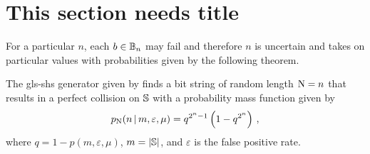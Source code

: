 \documentclass[ ../main.tex]{subfiles}
\begin{document}
\section{This section needs title}
For a particular $n$, each $b \in \mathbb{B}_n$ may fail and therefore $n$ is uncertain and takes on particular values with probabilities given by the following theorem.
\begin{theorem}
\label{thm:N_pmf}
The \gls{gls-shs} generator given by  finds a bit string of random length $\mathrm{N} = n$ that results in a perfect collision on $\mathbb{S}$ with a probability mass function given by
\begin{equation}
\label{eq:N_pmf}
    p_{\mathrm{N}}(n {\,|\,} m, \varepsilon, \mu) = q^{2^n-1}\left(1 - q^{2^n}\right)\,,
\end{equation}
where $q = 1 - p(m,\varepsilon,\mu)$, $m = \left\vert{\mathbb{S}}\right\vert$, and $\varepsilon$ is the false positive rate.
\end{theorem}
\end{document}
